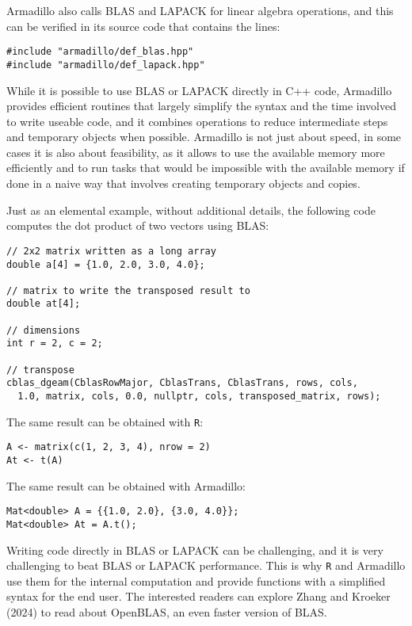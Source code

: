 Armadillo also calls BLAS and LAPACK for linear algebra operations, and this
can be verified in its source code that contains the lines:

\begin{verbatim}
#include "armadillo/def_blas.hpp"
#include "armadillo/def_lapack.hpp"
\end{verbatim}

While it is possible to use BLAS or LAPACK directly in C++ code, Armadillo
provides efficient routines that largely simplify the syntax and the time
involved to write useable code, and it combines operations to reduce
intermediate steps and temporary objects when possible. Armadillo is not just
about speed, in some cases it is also about feasibility, as it allows to use the
available memory more efficiently and to run tasks that would be impossible with
the available memory if done in a naive way that involves creating temporary
objects and copies.

Just as an elemental example, without additional details, the following code
computes the dot product of two vectors using BLAS:

\begin{verbatim}
// 2x2 matrix written as a long array
double a[4] = {1.0, 2.0, 3.0, 4.0};
    
// matrix to write the transposed result to
double at[4];

// dimensions
int r = 2, c = 2;

// transpose
cblas_dgeam(CblasRowMajor, CblasTrans, CblasTrans, rows, cols, 
  1.0, matrix, cols, 0.0, nullptr, cols, transposed_matrix, rows);
\end{verbatim}

The same result can be obtained with \texttt{R}:

\begin{verbatim}
A <- matrix(c(1, 2, 3, 4), nrow = 2)
At <- t(A)
\end{verbatim}

The same result can be obtained with Armadillo:

\begin{verbatim}
Mat<double> A = {{1.0, 2.0}, {3.0, 4.0}};
Mat<double> At = A.t();
\end{verbatim}

Writing code directly in BLAS or LAPACK can be challenging, and it is very
challenging to beat BLAS or LAPACK performance. This is why \texttt{R} and Armadillo
use them for the internal computation and provide functions with a simplified
syntax for the end user. The interested readers can explore Zhang and Kroeker (2024)
to read about OpenBLAS, an even faster version of BLAS.

